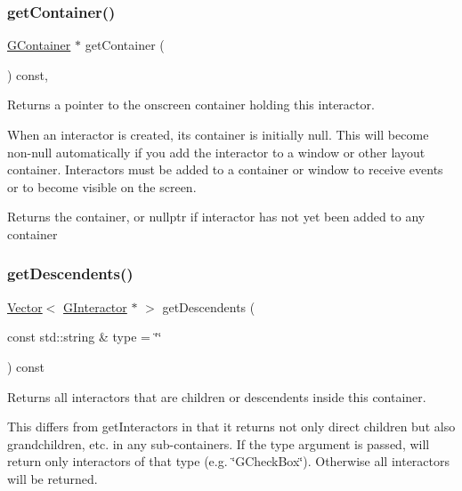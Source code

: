 \subsubsection{\texorpdfstring{get\+Container()}{getContainer()}}
{\footnotesize\ttfamily \mbox{\hyperlink{classGContainer}{G\+Container}} $\ast$ get\+Container (\begin{DoxyParamCaption}{ }\end{DoxyParamCaption}) const\hspace{0.3cm}{\ttfamily [virtual]}, {\ttfamily [inherited]}}



Returns a pointer to the onscreen container holding this interactor. 

When an interactor is created, its container is initially null. This will become non-\/null automatically if you add the interactor to a window or other layout container. Interactors must be added to a container or window to receive events or to become visible on the screen. \begin{DoxyReturn}{Returns}
the container, or nullptr if interactor has not yet been added to any container 
\end{DoxyReturn}
\mbox{\label{classGContainer_a5c520260dc9282097022249ea42c4a3f}} 
\subsubsection{\texorpdfstring{get\+Descendents()}{getDescendents()}}
{\footnotesize\ttfamily \mbox{\hyperlink{classVector}{Vector}}$<$ \mbox{\hyperlink{classGInteractor}{G\+Interactor}} $\ast$ $>$ get\+Descendents (\begin{DoxyParamCaption}\item[{const std\+::string \&}]{type = {\ttfamily \char`\"{}\char`\"{}} }\end{DoxyParamCaption}) const\hspace{0.3cm}{\ttfamily [virtual]}}



Returns all interactors that are children or descendents inside this container. 

This differs from get\+Interactors in that it returns not only direct children but also grandchildren, etc. in any sub-\/containers. If the type argument is passed, will return only interactors of that type (e.\+g. \char`\"{}\+G\+Check\+Box\char`\"{}). Otherwise all interactors will be returned. \mbox{\label{classGInteractor_a894a5502900794eeb27d084c21f1d77d}} 
